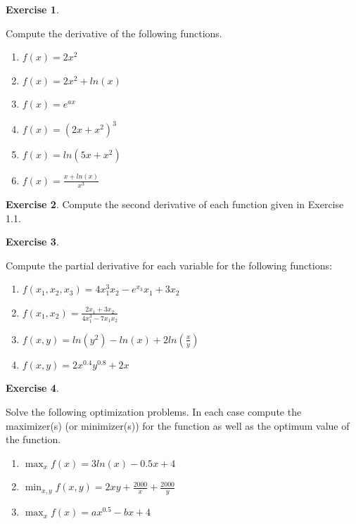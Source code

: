 \documentclass[
]{book}
\theoremstyle{definition}
\theoremstyle{definition}
\theoremstyle{definition}
\newtheorem{exercise}{Exercise}[chapter]
\theoremstyle{definition}
\theoremstyle{remark}
\begin{document}
\begin{exercise}
\protect\hypertarget{exr:unnamed-chunk-62}{}\label{exr:unnamed-chunk-62}

Compute the derivative of the following functions.

\begin{enumerate}
\def\labelenumi{\alph{enumi}.}
\item
  \(f(x)=2x^2\)
\item
  \(f(x)=2x^2+ ln(x)\)
\item
  \(f(x)=e^{ax}\)
\item
  \(f(x)= (2x+x^2)^3\)
\item
  \(f(x)= ln(5x+x^2)\)
\item
  \(f(x)= \displaystyle{\frac{x+ln(x)}{x^3}}\)
\end{enumerate}

\end{exercise}

\begin{exercise}
\protect\hypertarget{exr:unnamed-chunk-63}{}\label{exr:unnamed-chunk-63}Compute the second derivative of each function given in Exercise 1.1.
\end{exercise}

\begin{exercise}
\protect\hypertarget{exr:unnamed-chunk-64}{}\label{exr:unnamed-chunk-64}

Compute the partial derivative for each variable for the following functions:

\begin{enumerate}
\def\labelenumi{\alph{enumi}.}
\item
  \(f(x_1,x_2,x_3)=4x_1^3x_2-e^{x_3}x_1+3 x_2\)
\item
  \(\displaystyle{f(x_1,x_2)=\frac{2x_1 +3x_2}{4x_1^3-7x_1x_2}}\)
\item
  \(\displaystyle{f(x, y)= ln(y^2)-ln(x)+2 ln\left(\frac{x}{y}\right)}\)
\item
  \(f(x,y)=2x^{0.4} y^{0.8}+2x\)
\end{enumerate}

\end{exercise}

\begin{exercise}
\protect\hypertarget{exr:unnamed-chunk-65}{}\label{exr:unnamed-chunk-65}

Solve the following optimization problems. In each case compute the maximizer(s) (or minimizer(s)) for the function as well as the optimum value of the function.

\begin{enumerate}
\def\labelenumi{\alph{enumi}.}
\item
  \(\displaystyle{\max_x f(x) = 3ln(x) - 0.5x+4}\)
\item
  \(\displaystyle{\min_{x,y} f(x,y) = 2xy+\frac{2000}{x}+\frac{2000}{y}}\)
\item
  \(\displaystyle{\max_x f(x) = ax^{0.5} - bx+4}\)
\end{enumerate}

\end{exercise}
\end{document}
